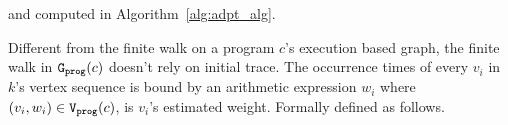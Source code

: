 and computed 
in Algorithm~\ref{alg:adpt_alg}.
%
%

Different from the finite walk on a program $c$'s execution based graph,
the finite walk in $\mathtt{{G_{prog}}}(c)$ doesn't rely on initial trace.
The occurrence times of every $v_i $ in $k$'s vertex sequence is bound by 
an arithmetic expression $w_i$ where $(v_i, w_i) \in \mathtt{{V_{prog}}}(c)$, is $v_i$'s estimated weight. 
%
Formally defined as follows.
